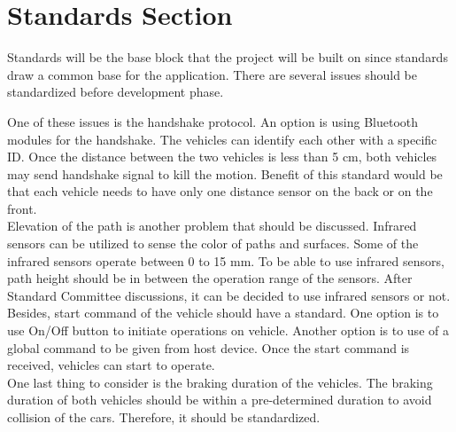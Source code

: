 \documentclass[a4paper,12pt]{article}
\begin{document}
	
	
	
	




	

\section{Standards Section}
Standards will be the base block that the project will be built on since standards draw a common base for the application. There are several issues should be standardized before development phase. 

One of these issues is the handshake protocol. An option is using Bluetooth modules for the handshake. The vehicles can identify each other with a specific ID. Once the distance between the two vehicles is less than 5 cm, both vehicles may send handshake signal to kill the motion. Benefit of this standard would be that each vehicle needs to have only one distance sensor on the back or on the front.\\

Elevation of the path is another problem that should be discussed. Infrared sensors can be utilized to sense the color of paths and surfaces. Some of the infrared sensors operate between 0 to 15 mm. To be able to use infrared sensors, path height should be in between the operation range of the sensors. After Standard Committee discussions, it can be decided to use infrared sensors or not.\\

Besides, start command of the vehicle should have a standard. One option is to use On/Off button to initiate operations on vehicle. Another option is to use of a global command to be given from host device. Once the start command is received, vehicles can start to operate.\\

One last thing to consider is the braking duration of the vehicles. The braking duration of both vehicles should be within a pre-determined duration to avoid collision of the cars. Therefore, it should be standardized.      
\end{document}
